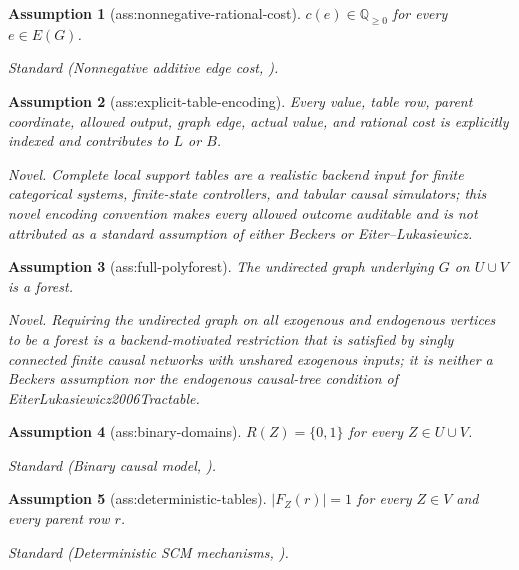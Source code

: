 \documentclass{article}
\newtheorem{assumption}{Assumption}
\begin{document}
\begin{assumption}[ass:nonnegative-rational-cost]\label{ass:nonnegative-rational-cost}
\(c(e)\in\mathbb Q_{\ge 0}\) for every \(e\in E(G)\).
\par\smallskip\noindent\emph{Standard} (Nonnegative additive edge cost, \cite{IbrahimPretschner2020Optimization}).
\end{assumption}

\begin{assumption}[ass:explicit-table-encoding]\label{ass:explicit-table-encoding}
Every value, table row, parent coordinate, allowed output, graph edge, actual value, and rational cost is explicitly indexed and contributes to \(L\) or \(B\).
\par\smallskip\noindent\emph{Novel.} Complete local support tables are a realistic backend input for finite categorical systems, finite-state controllers, and tabular causal simulators; this novel encoding convention makes every allowed outcome auditable and is not attributed as a standard assumption of either Beckers or Eiter--Lukasiewicz.
\end{assumption}

\begin{assumption}[ass:full-polyforest]\label{ass:full-polyforest}
The undirected graph underlying \(G\) on \(U\cup V\) is a forest.
\par\smallskip\noindent\emph{Novel.} Requiring the undirected graph on all exogenous and endogenous vertices to be a forest is a backend-motivated restriction that is satisfied by singly connected finite causal networks with unshared exogenous inputs; it is neither a Beckers assumption nor the endogenous causal-tree condition of EiterLukasiewicz2006Tractable.
\end{assumption}

\begin{assumption}[ass:binary-domains]\label{ass:binary-domains}
\(R(Z)=\{0,1\}\) for every \(Z\in U\cup V\).
\par\smallskip\noindent\emph{Standard} (Binary causal model, \cite{EiterLukasiewicz2002Complexity}).
\end{assumption}

\begin{assumption}[ass:deterministic-tables]\label{ass:deterministic-tables}
\(|F_Z(r)|=1\) for every \(Z\in V\) and every parent row \(r\).
\par\smallskip\noindent\emph{Standard} (Deterministic SCM mechanisms, \cite{EiterLukasiewicz2002Complexity}).
\end{assumption}
\end{document}
